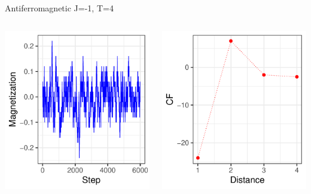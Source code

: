 \documentclass{beamer}
\begin{document}
\begin{frame}{Antiferromagnetic J=-1, T=4}
\begin{columns}
\begin{column}{0.5\textwidth}
    \begin{center}
     \includegraphics[width=\textwidth]{Pic/J-1_60_2500_T=4_Magnetization.pdf}
     \end{center}
\end{column}
\begin{column}{0.5\textwidth}
    \begin{center}
     \includegraphics[width=\textwidth]{Pic/J-1_60_2500_T=4_CORRELATION.pdf}

\end{center}
\end{column}
\end{columns}
\end{frame}
\end{document}

